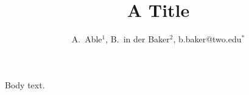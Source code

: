 \documentclass{revtex4-2}
\begin{document}
\title{A Title}
\author{A.~Able$^{1}$, B.~in der Baker$^{2}$, b.baker@two.edu$^{*}$}
\maketitle
Body text.
\end{document}
